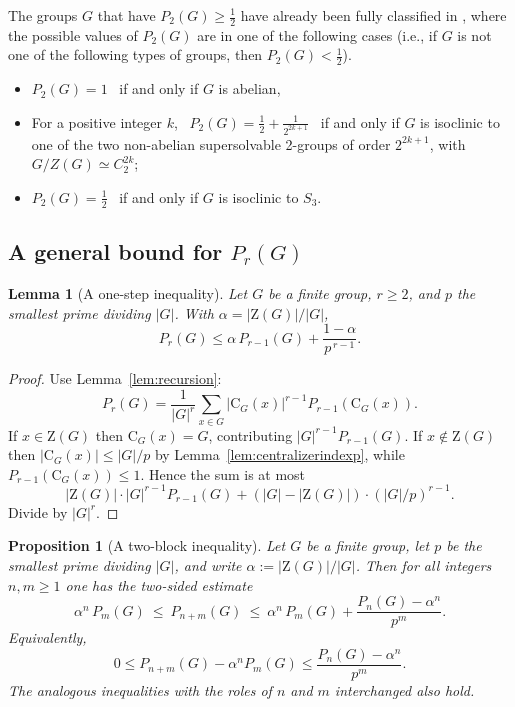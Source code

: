 \documentclass[11pt]{article}
\newtheorem{proposition}[theorem]{Proposition}
\newtheorem{lemma}[theorem]{Lemma}
\theoremstyle{definition}
\theoremstyle{remark}
\theoremstyle{definition}
\theoremstyle{plain}
\newcommand{\Z}{\mathrm{Z}}
\newcommand{\C}{\mathrm{C}}
\begin{document}
The groups $G$ that have $P_2(G)\geq \frac{1}{2}$ have already been fully classified in \cite{Lescot1995}, where the possible values of $P_2(G)$ are in one of the following cases (i.e., if $G$ is not one of the following types of groups, then $P_2(G)<\frac{1}{2}$).
\begin{itemize}
    \item $P_2(G)=1$ ~if and only if $G$ is abelian,
    \item For a positive integer $k$, ~$P_2(G)=\frac{1} {2}+\frac{1}{2^{2k+1}}$ ~if and only if $G$ is isoclinic to one of the two non-abelian supersolvable 2-groups of order $2^{2k+1}$, with $G/Z(G)\simeq C_2^{2k}$;
    \item $P_2(G)=\frac{1}{2}$ ~if and only if $G$ is isoclinic to $S_3$.
\end{itemize}

\subsection{A general bound for \texorpdfstring{$P_r(G)$}{Pr(G)}}
\begin{lemma}[A one-step inequality]\label{lem:onestep}
Let $G$ be a finite group, $r\ge 2$, and $p$ the smallest prime dividing $|G|$.
With $\alpha=|\Z(G)|/|G|$,
\[
P_r(G)\le \alpha\,P_{r-1}(G) + \frac{1-\alpha}{p^{\,r-1}}.
\]
\end{lemma}

\begin{proof}
Use Lemma~\ref{lem:recursion}:
\[
P_r(G)=\frac{1}{|G|^r}\sum_{x\in G} |\C_G(x)|^{r-1}P_{r-1}(\C_G(x)).
\]
If $x\in \Z(G)$ then $\C_G(x)=G$, contributing $|G|^{r-1}P_{r-1}(G)$.
If $x\notin \Z(G)$ then $|\C_G(x)|\le |G|/p$ by Lemma~\ref{lem:centralizerindexp}, while
$P_{r-1}(\C_G(x))\le 1$. Hence the sum is at most
\[
|\Z(G)|\cdot |G|^{r-1}P_{r-1}(G) + (|G|-|\Z(G)|)\cdot (|G|/p)^{r-1}.
\]
Divide by $|G|^r$.
\end{proof}

\begin{proposition}[A two-block inequality]\label{prop:twoblock}
Let $G$ be a finite group, let $p$ be the smallest prime dividing $|G|$, and write
$\alpha:=|\Z(G)|/|G|$.
Then for all integers $n,m\ge 1$ one has the two-sided estimate
\[
\alpha^{n}\,P_m(G)\ \le\ P_{n+m}(G)\ \le\ \alpha^{n}\,P_m(G) + \frac{P_n(G)-\alpha^{n}}{p^{m}}.
\]
Equivalently,
\[
0\le P_{n+m}(G)-\alpha^{n}P_m(G)\le \frac{P_n(G)-\alpha^{n}}{p^{m}}.
\]
The analogous inequalities with the roles of $n$ and $m$ interchanged also hold.
\end{proposition}
\end{document}
